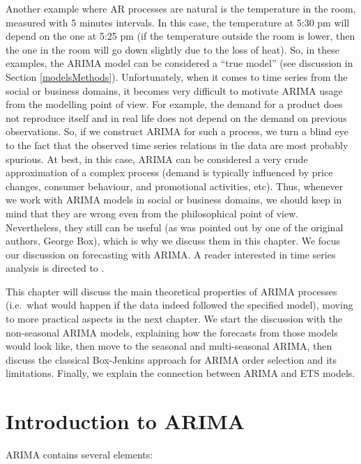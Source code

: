 \documentclass[
]{book}
\theoremstyle{definition}
\theoremstyle{definition}
\theoremstyle{definition}
\theoremstyle{definition}
\theoremstyle{remark}
\begin{document}
Another example where AR processes are natural is the temperature in the room, measured with 5 minutes intervals. In this case, the temperature at 5:30 pm will depend on the one at 5:25 pm (if the temperature outside the room is lower, then the one in the room will go down slightly due to the loss of heat). So, in these examples, the ARIMA model can be considered a ``true model'' (see discussion in Section \ref{modelsMethods}). Unfortunately, when it comes to time series from the social or business domains, it becomes very difficult to motivate ARIMA usage from the modelling point of view. For example, the demand for a product does not reproduce itself and in real life does not depend on the demand on previous observations. So, if we construct ARIMA for such a process, we turn a blind eye to the fact that the observed time series relations in the data are most probably spurious. At best, in this case, ARIMA can be considered a very crude approximation of a complex process (demand is typically influenced by price changes, consumer behaviour, and promotional activities, etc). Thus, whenever we work with ARIMA models in social or business domains, we should keep in mind that they are wrong even from the philosophical point of view. Nevertheless, they still can be useful (as was pointed out by one of the original authors, George Box), which is why we discuss them in this chapter. We focus our discussion on forecasting with ARIMA. A reader interested in time series analysis is directed to \citet{Box1976}.

This chapter will discuss the main theoretical properties of ARIMA processes (i.e.~what would happen if the data indeed followed the specified model), moving to more practical aspects in the next chapter. We start the discussion with the non-seasonal ARIMA models, explaining how the forecasts from those models would look like, then move to the seasonal and multi-seasonal ARIMA, then discuss the classical Box-Jenkins approach for ARIMA order selection and its limitations. Finally, we explain the connection between ARIMA and ETS models.

\hypertarget{ARIMAIntro}{%
\section{Introduction to ARIMA}\label{ARIMAIntro}}

ARIMA contains several elements:
\end{document}
